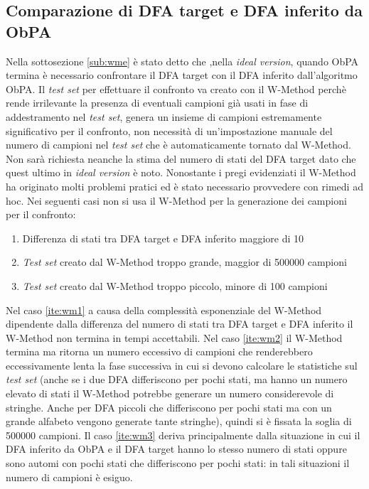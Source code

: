 \subsection[Valutazione DFA inferito]{Comparazione di DFA target e DFA inferito da ObPA}
\label{sub:comdfa}
Nella sottosezione \ref{sub:wme} è stato detto che ,nella \textit{ideal version}, quando \ac{ObPA} termina è necessario confrontare il \ac{DFA} target con il \ac{DFA} inferito dall'algoritmo \ac{ObPA}. Il \textit{test set} per effettuare il confronto va creato con il W-Method perchè rende irrilevante la presenza di eventuali campioni già usati in fase di addestramento nel \textit{test set}, genera un insieme di campioni estremamente significativo per il confronto, non necessità di un'impostazione manuale del numero di campioni nel \textit{test set} che è automaticamente tornato dal W-Method. Non sarà richiesta neanche la stima del numero di stati del \ac{DFA} target dato che quest ultimo in \textit{ideal version} è noto. Nonostante i pregi evidenziati il W-Method ha originato molti problemi pratici ed è stato necessario provvedere con rimedi ad hoc. Nei seguenti casi non si usa il W-Method per la generazione dei campioni per il confronto:
\begin{enumerate}
\item \label{ite:wm1}Differenza di stati tra \ac{DFA} target e \ac{DFA} inferito maggiore di 10
\item \label{ite:wm2} \textit{Test set} creato dal W-Method troppo grande, maggior di 500000 campioni
\item \label{ite:wm3} \textit{Test set} creato dal W-Method troppo piccolo, minore di 100 campioni
\end{enumerate}
 Nel caso \ref{ite:wm1} a causa della complessità esponenziale del W-Method dipendente dalla differenza del numero di stati tra \ac{DFA} target e \ac{DFA} inferito il W-Method non termina in tempi accettabili. Nel caso \ref{ite:wm2} il W-Method termina ma ritorna un numero eccessivo di campioni che renderebbero eccessivamente lenta la fase successiva in cui si devono calcolare le statistiche sul \textit{test set} (anche se i due \ac{DFA} differiscono per pochi stati, ma hanno un numero elevato di stati il W-Method potrebbe generare un numero considerevole di stringhe. Anche per \ac{DFA} piccoli che differiscono per pochi stati ma con un grande alfabeto vengono generate tante stringhe), quindi si è fissata la soglia di 500000 campioni.  Il caso \ref{ite:wm3} deriva principalmente dalla situazione in cui il \ac{DFA} inferito da \ac{ObPA} e il \ac{DFA} target hanno lo stesso numero di stati oppure sono automi con pochi stati che differiscono per pochi stati: in tali situazioni il numero di campioni è esiguo.
 
